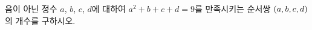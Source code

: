 음이 아닌 정수 $a$, $b$, $c$, $d$에 대하여 $a^2+b+c+d=9$를 만족시키는 순서쌍 $(a{,}\mkern3mu\mathopen{}b{,}\mkern3mu\mathopen{}c{,}\mkern3mu\mathopen{}d)$의 개수를 구하시오.
